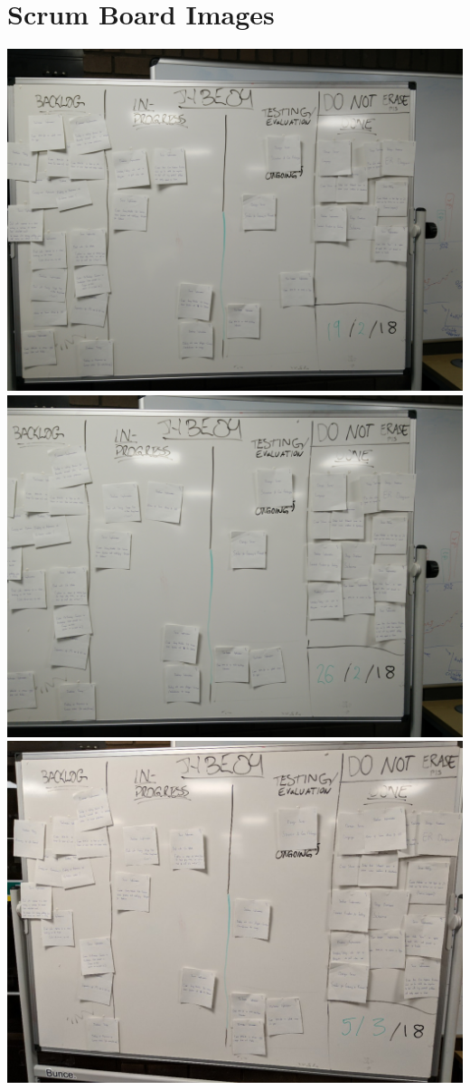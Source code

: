 \section{Scrum Board Images} \label{app:board}

{
\centering
\includegraphics[width=\textwidth]{graphics/scrum.jpg}
\includegraphics[width=\textwidth]{graphics/scrum3.jpg}
\includegraphics[width=\textwidth]{graphics/scrum4.jpg}
}
